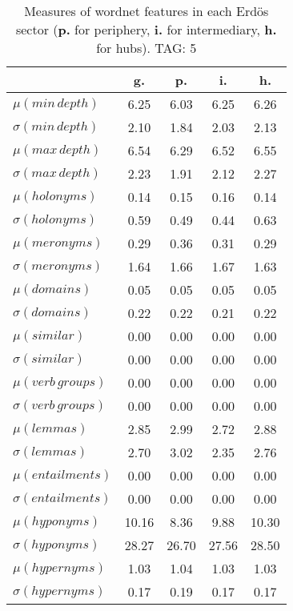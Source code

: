 \begin{table}[h!]
\begin{center}
\begin{tabular}{| l | c | c | c | c |}\hline
 & g. & p. & i. & h. \\\hline
$\mu(min\,depth)$ & 6.25  & 6.03  & 6.25  & 6.26 \\\hline
$\sigma(min\,depth)$ & 2.10  & 1.84  & 2.03  & 2.13 \\\hline
$\mu(max\,depth)$ & 6.54  & 6.29  & 6.52  & 6.55 \\\hline
$\sigma(max\,depth)$ & 2.23  & 1.91  & 2.12  & 2.27 \\\hline
$\mu(holonyms)$ & 0.14  & 0.15  & 0.16  & 0.14 \\\hline
$\sigma(holonyms)$ & 0.59  & 0.49  & 0.44  & 0.63 \\\hline
$\mu(meronyms)$ & 0.29  & 0.36  & 0.31  & 0.29 \\\hline
$\sigma(meronyms)$ & 1.64  & 1.66  & 1.67  & 1.63 \\\hline
$\mu(domains)$ & 0.05  & 0.05  & 0.05  & 0.05 \\\hline
$\sigma(domains)$ & 0.22  & 0.22  & 0.21  & 0.22 \\\hline
$\mu(similar)$ & 0.00  & 0.00  & 0.00  & 0.00 \\\hline
$\sigma(similar)$ & 0.00  & 0.00  & 0.00  & 0.00 \\\hline
$\mu(verb\,groups)$ & 0.00  & 0.00  & 0.00  & 0.00 \\\hline
$\sigma(verb\,groups)$ & 0.00  & 0.00  & 0.00  & 0.00 \\\hline
$\mu(lemmas)$ & 2.85  & 2.99  & 2.72  & 2.88 \\\hline
$\sigma(lemmas)$ & 2.70  & 3.02  & 2.35  & 2.76 \\\hline
$\mu(entailments)$ & 0.00  & 0.00  & 0.00  & 0.00 \\\hline
$\sigma(entailments)$ & 0.00  & 0.00  & 0.00  & 0.00 \\\hline
$\mu(hyponyms)$ & 10.16  & 8.36  & 9.88  & 10.30 \\\hline
$\sigma(hyponyms)$ & 28.27  & 26.70  & 27.56  & 28.50 \\\hline
$\mu(hypernyms)$ & 1.03  & 1.04  & 1.03  & 1.03 \\\hline
$\sigma(hypernyms)$ & 0.17  & 0.19  & 0.17  & 0.17 \\\hline
\end{tabular}
\caption{Measures of wordnet features in each Erd\"os sector ({{\bf p.}} for periphery, {{\bf i.}} for intermediary, {{\bf h.}} for hubs). TAG: 5}
\end{center}
\end{table}